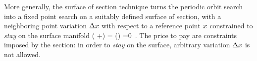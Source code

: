 More generally, the {\Poincare} surface of section technique
turns the periodic orbit search into a
fixed point search on a suitably defined surface of section,
with a neighboring point variation $\Delta x$ with respect to
a reference point  $x$ constrained to \emph{stay} on the
surface manifold
\beq
\PoincC( \ssp+\Delta\ssp) = \PoincC (\ssp) =0
\,.
The price to pay are constraints imposed by the section: in
order to \emph{stay} on the surface, arbitrary variation
$\Delta x$ is not allowed.
